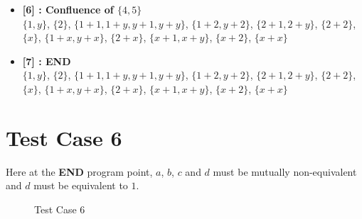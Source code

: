 \begin{itemize}
    \item \textbf{[6] : Confluence of $\{4, 5\}$}\\
        $\{1, y\}$, $\{2\}$, $\{1 + 1, 1 + y, y + 1, y + y\}$, $\{1 + 2, y + 2\}$, $\{2 + 1, 2 + y\}$, $\{2 + 2\}$, $\{x\}$, $\{1 + x, y + x\}$, $\{2 + x\}$, $\{x + 1, x + y\}$, $\{x + 2\}$, $\{x + x\}$

    \item \textbf{[7] : END}\\
        $\{1, y\}$, $\{2\}$, $\{1 + 1, 1 + y, y + 1, y + y\}$, $\{1 + 2, y + 2\}$, $\{2 + 1, 2 + y\}$, $\{2 + 2\}$, $\{x\}$, $\{1 + x, y + x\}$, $\{2 + x\}$, $\{x + 1, x + y\}$, $\{x + 2\}$, $\{x + x\}$

\end{itemize}

\section{Test Case 6}
\label{sec:tc3}
Here at the \textbf{END} program point, $a$, $b$, $c$ and $d$ must be mutually
non-equivalent and $d$ must be equivalent to $1$.

\begin{figure}[H]
\label{fig:tc6}
    \caption{Test Case 6}
\end{figure}


